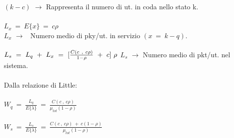 \documentclass[12pt,a4paper]{article}
\begin{document}
    $(k-c)$ $\rightarrow$ Rappresenta il numero di ut. in coda nello stato k.\\ \\
    $L_{x} \ = \ E\{x\} \ = \ c\rho$ \\
    $L_{x}$ $\rightarrow$ \ Numero medio di pky/ut. in servizio $(x \ = \ k-q)$. \\ \\
    $L_{s} \ = \ L_{q} \ + \ L_{x} \ = \ [\frac{C(c \ , \ c\rho)}{1-\rho} \ + \ c]\ \rho \\ $
    $L_{s}$ $\rightarrow$ Numero medio di pkt/ut. nel sistema. \\ \\ Dalla relazione di Little:\\ \\
    $W_{q} \ = \ \frac{L_{q}}{E\{\lambda\}} \ = \ \frac{C(c \ , \ c\rho)}{\mu_{tot}(1-\rho)}$ \\ \\
    $W_{s} \ = \ \frac{L_{s}}{E\{\lambda\}} \ = \ \frac{C(c \ , \ c\rho) \ + \ c(1-\rho)}{\mu_{tot}(1-\rho)}$ \\ 
\newpage
\end{document}
